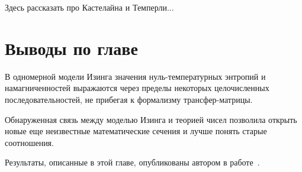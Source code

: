 Здесь рассказать про Кастелайна и Темперли...

\section{Выводы по главе}

В одномерной модели Изинга значения нуль-температурных энтропий и намагниченностей выражаются через пределы некоторых целочисленных последовательностей, не  прибегая к формализму трансфер-матрицы.

Обнаруженная связь между моделью Изинга и теорией чисел позволила открыть новые еще неизвестные математические сечения и лучше понять старые соотношения.

Результаты, описанные в этой главе, опубликованы автором в работе~\cite{vakbib3}.

\FloatBarrier